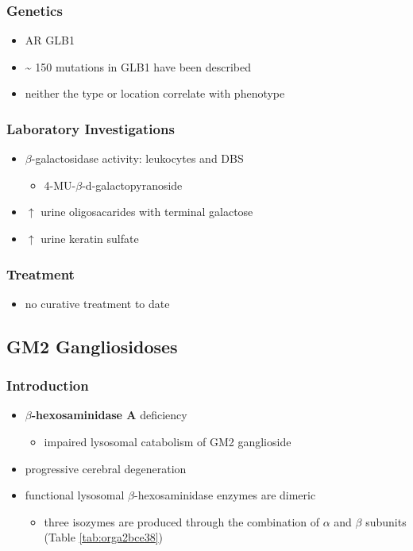 \documentclass[12pt]{scrartcl}
\begin{document}
\subsubsection{Genetics}
\label{sec:org7012fc9}
\begin{itemize}
\item AR GLB1
\item \textasciitilde{} 150 mutations in GLB1 have been described
\item neither the type or location correlate with phenotype
\end{itemize}
\subsubsection{Laboratory Investigations}
\label{sec:org1227cc5}
\begin{itemize}
\item \(\beta\)-galactosidase activity: leukocytes and DBS
\begin{itemize}
\item 4-MU-\(\beta\)-d-galactopyranoside
\end{itemize}
\item \(\uparrow\) urine oligosacarides with terminal galactose
\item \(\uparrow\) urine keratin sulfate
\end{itemize}

\subsubsection{Treatment}
\label{sec:orgbcba22d}
\begin{itemize}
\item no curative treatment to date
\end{itemize}
\subsection{GM2 Gangliosidoses}
\label{sec:org002e76c}
\subsubsection{Introduction}
\label{sec:org2ad740d}
\begin{itemize}
\item \textbf{\(\beta\)-hexosaminidase A} deficiency 
\begin{itemize}
\item impaired lysosomal catabolism of GM2 ganglioside
\end{itemize}
\item progressive cerebral degeneration
\item functional lysosomal \(\beta\)-hexosaminidase enzymes are dimeric
\begin{itemize}
\item three isozymes are produced through the combination of \(\alpha\)
and \(\beta\) subunits (Table \ref{tab:orga2bce38})
\end{itemize}
\end{itemize}
\end{document}

